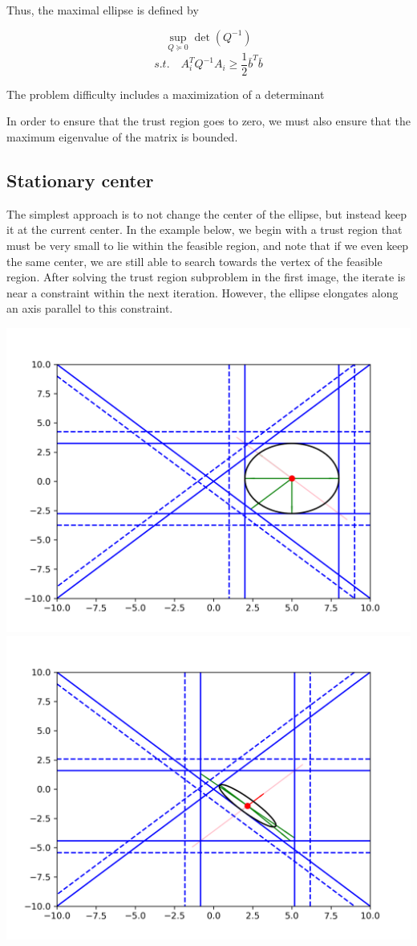 \documentclass{article}
\begin{document}
Thus, the maximal ellipse is defined by

\[
\sup_{Q \succeq 0} \det(Q^{-1})
\]
\[
s.t. \quad A_i^T Q^{-1} A_i \ge \frac 1 2 \bar{b}^T\bar{b}
\]


The problem difficulty includes a maximization of a determinant

In order to ensure that the trust region goes to zero, we must also ensure that the maximum eigenvalue of the matrix is bounded.


\subsection{Stationary center}
The simplest approach is to not change the center of the ellipse, but instead keep it at the current center.
In the example below, we begin with a trust region that must be very small to lie within the feasible region, and note that if we even keep the same center, we are still able to search towards the vertex of the feasible region.
After solving the trust region subproblem in the first image, the iterate is near a constraint within the next iteration.
However, the ellipse elongates along an axis parallel to this constraint.

\includegraphics[scale=0.2]{advantage_of_ellipse_1.png}
\includegraphics[scale=0.2]{advantage_of_ellipse_2.png}
\end{document}
